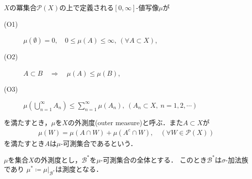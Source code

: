 		\begin{screen}
			\begin{dfn}[外測度]
				$X$の冪集合$\mathcal{P}(X)$の上で定義される$[0,\infty]$-値写像$\mu$が
				\begin{description}
					\item[(O1)] $\mu(\emptyset) = 0,\quad 0 \leq \mu(A) \leq \infty,\ (\forall A \subset X)$,
					\item[(O2)] $A \subset B \quad \Longrightarrow \quad \mu(A) \leq \mu(B)$,
					\item[(O3)] $\mu\left( \bigcup_{n=1}^\infty A_n \right) \leq \sum_{n=1}^\infty \mu(A_n),\ (A_n \subset X,\ n=1,2,\cdots)$
				\end{description}
				を満たすとき，$\mu$を$X$の外測度(outer measure)と呼ぶ．また$A \subset X$が
				\begin{align}
					\mu(W) = \mu(A \cap W) + \mu(A^c \cap W), \quad (\forall W \in \mathcal{P}(X))
				\end{align}
				を満たすとき$A$は$\mu$-可測集合であるという．
			\end{dfn}
		\end{screen}
		
		\begin{screen}
			\begin{thm}[Caratheodoryの拡張定理]
				$\mu$を集合$X$の外測度とし，$\mathcal{B}^*$を$\mu$-可測集合の全体とする．
				このとき$\mathcal{B}^*$は$\sigma$-加法族であり
				$\mu^* \coloneqq \left. \mu \right|_{\mathcal{B}^*}$は測度となる．
			\end{thm}
		\end{screen}
		
		\begin{screen}
			\begin{thm}[有限加法的な正値測度により定まる外測度]
				
			\end{thm}
		\end{screen}
		
